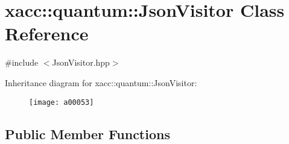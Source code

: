 \hypertarget{a00053}{}\section{xacc\+:\+:quantum\+:\+:Json\+Visitor Class Reference}
\label{a00053}


{\ttfamily \#include $<$Json\+Visitor.\+hpp$>$}

Inheritance diagram for xacc\+:\+:quantum\+:\+:Json\+Visitor\+:\begin{figure}[H]
\begin{center}
\leavevmode
\texttt{[image: a00053]}
\end{center}
\end{figure}
\subsection*{Public Member Functions}
